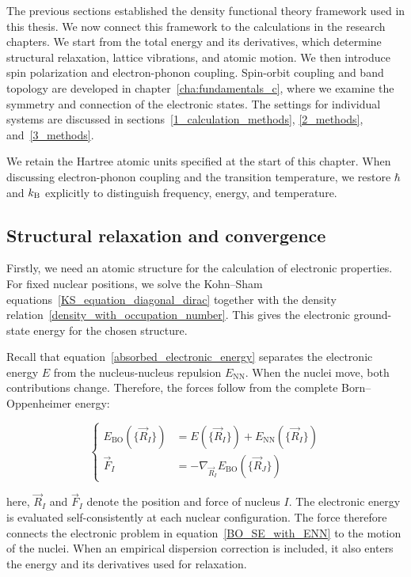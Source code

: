 The previous sections established the density functional theory framework used in this thesis.
We now connect this framework to the calculations in the research chapters.
We start from the total energy and its derivatives,
which determine structural relaxation, lattice vibrations, and atomic motion.
We then introduce spin polarization and electron-phonon coupling.
Spin-orbit coupling and band topology are developed in chapter~\ref{cha:fundamentals_c},
where we examine the symmetry and connection of the electronic states.
The settings for individual systems are discussed in sections~\ref{1_calculation_methods}, \ref{2_methods}, and~\ref{3_methods}.

We retain the Hartree atomic units specified at the start of this chapter.
When discussing electron-phonon coupling and the transition temperature,
we restore $\hbar$ and $k_\mathrm{B}$ explicitly to distinguish frequency, energy, and temperature.

\FloatBarrier
\subsection{Structural relaxation and convergence}
\label{subsec:method_relaxation}

Firstly, we need an atomic structure for the calculation of electronic properties.
For fixed nuclear positions,
we solve the Kohn--Sham equations~\eqref{KS_equation_diagonal_dirac} together with the density relation~\eqref{density_with_occupation_number}.
This gives the electronic ground-state energy for the chosen structure.

Recall that equation~\eqref{absorbed_electronic_energy} separates the electronic energy $E$ from the nucleus-nucleus repulsion $E_\mathrm{NN}$.
When the nuclei move, both contributions change.
Therefore, the forces follow from the complete Born--Oppenheimer energy:

\begin{equation}
\left\{\begin{aligned}
    E_\mathrm{BO}(\{\vec{R}_I\})
    &= E(\{\vec{R}_I\})+E_\mathrm{NN}(\{\vec{R}_I\}) \\
    \vec{F}_I
    &= -\nabla_{\vec{R}_I}E_\mathrm{BO}(\{\vec{R}_J\})
\end{aligned}\right.
\label{BO_energy_and_force}
\end{equation}

here, $\vec{R}_I$ and $\vec{F}_I$ denote the position and force of nucleus $I$.
The electronic energy is evaluated self-consistently at each nuclear configuration.
The force therefore connects the electronic problem in equation~\eqref{BO_SE_with_ENN} to the motion of the nuclei.
When an empirical dispersion correction is included,
it also enters the energy and its derivatives used for relaxation.

